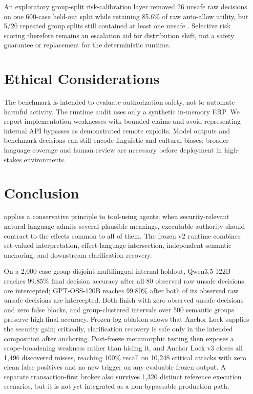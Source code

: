 An exploratory group-split risk-calibration layer removed 26 unsafe raw \allow decisions on one 600-case held-out split while retaining 85.6\% of raw auto-allow utility, but 5/20 repeated group splits still contained at least one unsafe \allow. Selective risk scoring therefore remains an escalation aid for distribution shift, not a safety guarantee or replacement for the deterministic runtime.

\section{Ethical Considerations}
The benchmark is intended to evaluate authorization safety, not to automate harmful activity. The runtime audit uses only a synthetic in-memory ERP. We report implementation weaknesses with bounded claims and avoid representing internal API bypasses as demonstrated remote exploits. Model outputs and benchmark decisions can still encode linguistic and cultural biases; broader language coverage and human review are necessary before deployment in high-stakes environments.

\section{Conclusion}
\system applies a conservative principle to tool-using agents: when security-relevant natural language admits several plausible meanings, executable authority should contract to the effects common to all of them. The frozen v2 runtime combines set-valued interpretation, effect-language intersection, independent semantic anchoring, and downstream clarification recovery.

On a 2,000-case group-disjoint multilingual internal holdout, Qwen3.5-122B reaches 99.85\% final decision accuracy after all 80 observed raw unsafe \allow decisions are intercepted; GPT-OSS-120B reaches 99.80\% after both of its observed raw unsafe \allow decisions are intercepted. Both finish with zero observed unsafe \allow decisions and zero false blocks, and group-clustered intervals over 500 semantic groups preserve high final accuracy. Frozen-log ablation shows that Anchor Lock supplies the security gain; critically, clarification recovery is safe only in the intended composition after anchoring. Post-freeze metamorphic testing then exposes a scope-broadening weakness rather than hiding it, and Anchor Lock v3 closes all 1,496 discovered misses, reaching 100\% recall on 10,248 critical attacks with zero clean false positives and no new trigger on any evaluable frozen output. A separate transaction-first broker also survives 1,320 distinct reference execution scenarios, but it is not yet integrated as a non-bypassable production path.


